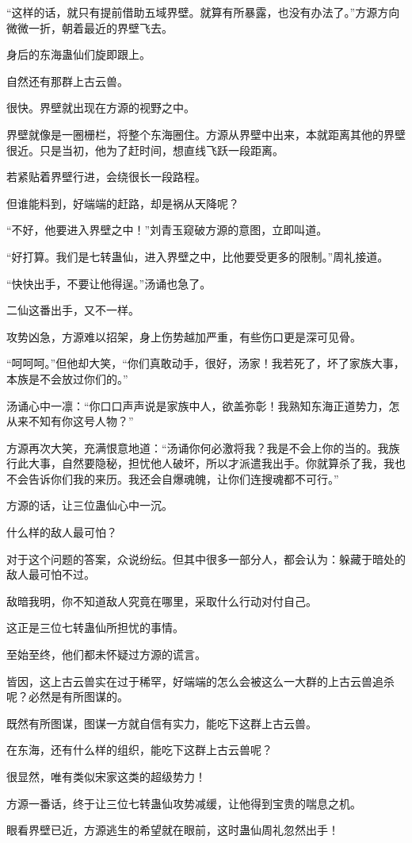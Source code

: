 \begin{this_body}
“这样的话，就只有提前借助五域界壁。就算有所暴露，也没有办法了。”方源方向微微一折，朝着最近的界壁飞去。

身后的东海蛊仙们旋即跟上。

自然还有那群上古云兽。

很快。界壁就出现在方源的视野之中。

界壁就像是一圈栅栏，将整个东海圈住。方源从界壁中出来，本就距离其他的界壁很近。只是当初，他为了赶时间，想直线飞跃一段距离。

若紧贴着界壁行进，会绕很长一段路程。

但谁能料到，好端端的赶路，却是祸从天降呢？

“不好，他要进入界壁之中！”刘青玉窥破方源的意图，立即叫道。

“好打算。我们是七转蛊仙，进入界壁之中，比他要受更多的限制。”周礼接道。

“快快出手，不要让他得逞。”汤诵也急了。

二仙这番出手，又不一样。

攻势凶急，方源难以招架，身上伤势越加严重，有些伤口更是深可见骨。

“呵呵呵。”但他却大笑，“你们真敢动手，很好，汤家！我若死了，坏了家族大事，本族是不会放过你们的。”

汤诵心中一凛：“你口口声声说是家族中人，欲盖弥彰！我熟知东海正道势力，怎从来不知有你这号人物？”

方源再次大笑，充满恨意地道：“汤诵你何必激将我？我是不会上你的当的。我族行此大事，自然要隐秘，担忧他人破坏，所以才派遣我出手。你就算杀了我，我也不会告诉你们我的来历。我还会自爆魂魄，让你们连搜魂都不可行。”

方源的话，让三位蛊仙心中一沉。

什么样的敌人最可怕？

对于这个问题的答案，众说纷纭。但其中很多一部分人，都会认为：躲藏于暗处的敌人最可怕不过。

敌暗我明，你不知道敌人究竟在哪里，采取什么行动对付自己。

这正是三位七转蛊仙所担忧的事情。

至始至终，他们都未怀疑过方源的谎言。

皆因，这上古云兽实在过于稀罕，好端端的怎么会被这么一大群的上古云兽追杀呢？必然是有所图谋的。

既然有所图谋，图谋一方就自信有实力，能吃下这群上古云兽。

在东海，还有什么样的组织，能吃下这群上古云兽呢？

很显然，唯有类似宋家这类的超级势力！

方源一番话，终于让三位七转蛊仙攻势减缓，让他得到宝贵的喘息之机。

眼看界壁已近，方源逃生的希望就在眼前，这时蛊仙周礼忽然出手！

\end{this_body}

